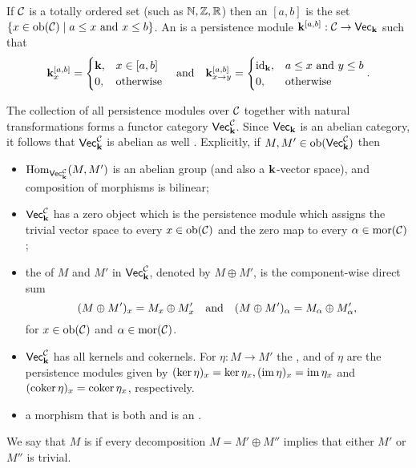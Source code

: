 \begin{example}\label{example:intervalModule}
    If $\mathcal{C}$ is a totally ordered set (such as $\mathbb{N},\mathbb{Z},\mathbb{R}$) then an  $[a,b]$ is the set $\{x\in\operatorname{ob}(\mathcal{C})\mid a\leq x\text{ and }x\leq b\}$.
    An  is a persistence module $\mathbf{k}^{[a,b]}:\mathcal{C}\to\normalfont\mathsf{Vec}_{\mathbf{k}}$ such that
    \[ \mathbf{k}^{[a,b]}_x=\begin{cases}
        \mathbf{k},&x\in[a,b]\\
        0,&\text{otherwise}
    \end{cases}\quad\text{and}\quad\mathbf{k}^{[a,b]}_{x\to y}=\begin{cases}
        \operatorname{id}_{\mathbf{k}},&a\leq x\text{ and } y\leq b\\
        0,&\text{otherwise}
    \end{cases}. \]
\end{example}
The collection of all persistence modules over $\mathcal{C}$ together with natural transformations forms a functor category $\normalfont\mathsf{Vec}_{\mathbf{k}}^{\mathcal{C}}$.
Since $\normalfont\mathsf{Vec}_{\mathbf{k}}$ is an abelian category, it follows that $\normalfont\mathsf{Vec}_{\mathbf{k}}^{\mathcal{C}}$ is abelian as well \cite[p. 199]{maclane_1978}.
Explicitly, if $M, M'\in\operatorname{ob}(\normalfont\mathsf{Vec}_{\mathbf{k}}^{\mathcal{C}})$ then
\begin{itemize}
    \item $\operatorname{Hom}_{\normalfont\mathsf{Vec}_{\mathbf{k}}^{\mathcal{C}}}(M,M')$ is an abelian group (and also a $\mathbf{k}$-vector space), and composition of morphisms is bilinear; 
    \item $\normalfont\mathsf{Vec}_{\mathbf{k}}^{\mathcal{C}}$ has a zero object which is the persistence module which assigns the trivial vector space to every $x\in\operatorname{ob}(\mathcal{C})$ and the zero map to every $\alpha\in\operatorname{mor}(\mathcal{C})$;
    \item the  of $M$ and $M'$ in $\normalfont\mathsf{Vec}_{\mathbf{k}}^{\mathcal{C}}$, denoted by $M\oplus M'$, is the component-wise direct sum
        \[(M\oplus M')_x= M_x\oplus M'_x\quad\text{and}\quad (M\oplus M')_\alpha=M_\alpha\oplus M'_\alpha,  \]
        for $x\in\operatorname{ob}(\mathcal{C})$ and $\alpha\in\operatorname{mor}(\mathcal{C})$.
    \item $\normalfont\mathsf{Vec}_{\mathbf{k}}^{\mathcal{C}}$ has all kernels and cokernels. For $\eta\colon M\to M'$ the ,  and  of $\eta$ are the persistence modules given by $(\ker\eta)_x=\ker\eta_x, (\operatorname{im}\eta)_x=\operatorname{im}\eta_x$ and $(\operatorname{coker}\eta)_x=\operatorname{coker}\eta_x$, respectively.
    \item a morphism that is both  and  is an .
\end{itemize}
We say that $M$ is  if every decomposition $M=M'\oplus M''$ implies that either $M'$ or $M''$ is trivial.
